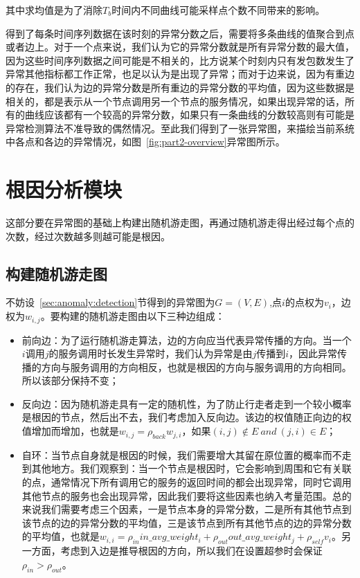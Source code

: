 其中求均值是为了消除$T_b$时间内不同曲线可能采样点个数不同带来的影响。

得到了每条时间序列数据在该时刻的异常分数之后，需要将多条曲线的值聚合到点或者边上。对于一个点来说，我们认为它的异常分数就是所有异常分数的最大值，因为这些时间序列数据之间可能是不相关的，比方说某个时刻内只有发包数发生了异常其他指标都工作正常，也足以认为是出现了异常；而对于边来说，因为有重边的存在，我们认为边的异常分数是所有重边的异常分数的平均值，因为这些数据是相关的，都是表示从一个节点调用另一个节点的服务情况，如果出现异常的话，所有的曲线应该都有一个较高的异常分数，如果只有一条曲线的分数较高则有可能是异常检测算法不准导致的偶然情况。至此我们得到了一张异常图，来描绘当前系统中各点和各边的异常情况，如图~\ref{fig:part2-overview}异常图所示。
\section{根因分析模块}
这部分要在异常图的基础上构建出随机游走图，再通过随机游走得出经过每个点的次数，经过次数越多则越可能是根因。


\subsection{构建随机游走图}
不妨设~\ref{sec:anomaly:detection}节得到的异常图为$G=(V,E)$,点$i$的点权为$v_i$，边权为$w_{i,j}$。要构建的随机游走图由以下三种边组成：
\begin{itemize}
  \item 前向边：为了运行随机游走算法，边的方向应当代表异常传播的方向。当一个$i$调用$j$的服务调用时长发生异常时，我们认为异常是由$j$传播到$i$，因此异常传播的方向与服务调用的方向相反，也就是根因的方向与服务调用的方向相同。所以该部分保持不变；
  \item 反向边：因为随机游走具有一定的随机性，为了防止行走者走到一个较小概率是根因的节点，然后出不去，我们考虑加入反向边。该边的权值随正向边的权值增加而增加，也就是$w_{i,j} = \rho_{back} w_{j,i}$，如果$(i,j) \notin E\ and\  (j,i) \in E$；
  \item 自环：当节点自身就是根因的时候，我们需要增大其留在原位置的概率而不走到其他地方。我们观察到：当一个节点是根因时，它会影响到周围和它有关联的点，通常情况下所有调用它的服务的返回时间的都会出现异常，同时它调用其他节点的服务也会出现异常，因此我们要将这些因素也纳入考量范围。总的来说我们需要考虑三个因素，一是节点本身的异常分数，二是所有其他节点到该节点的边的异常分数的平均值，三是该节点到所有其他节点的边的异常分数的平均值，也就是$w_{i,i} = \rho_{in} in\_avg\_weight_{i} + \rho_{out} out\_avg\_weight_{j}+ \rho_{self}  v_i$。另一方面，考虑到入边是推导根因的方向，所以我们在设置超参时会保证$\rho_{in}>\rho_{out}$。
\end{itemize}

